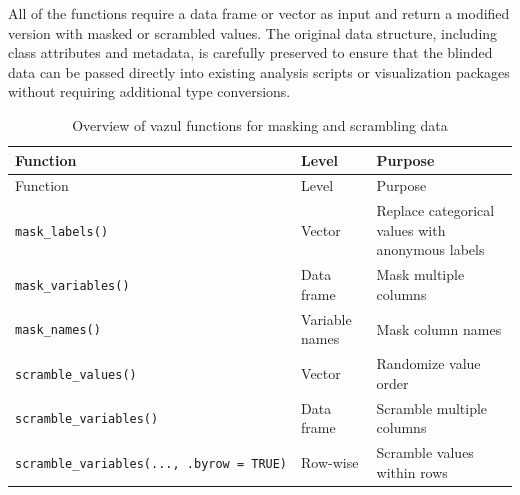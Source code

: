 All of the functions require a data frame or vector as input and return a modified version with masked or scrambled values. The original data structure, including class attributes and metadata, is carefully preserved to ensure that the blinded data can be passed directly into existing analysis scripts or visualization packages without requiring additional type conversions.

\begin{longtable}[]{@{}
  >{\raggedright\arraybackslash}p{}
  >{\raggedright\arraybackslash}p{}
  >{\raggedright\arraybackslash}p{}@{}}
\caption{Overview of vazul functions for masking and scrambling data}\tabularnewline
\toprule\noalign{}
\begin{minipage}[b]{\linewidth}\raggedright
Function
\end{minipage} & \begin{minipage}[b]{\linewidth}\raggedright
Level
\end{minipage} & \begin{minipage}[b]{\linewidth}\raggedright
Purpose
\end{minipage} \\
\midrule\noalign{}
\endfirsthead
\toprule\noalign{}
\begin{minipage}[b]{\linewidth}\raggedright
Function
\end{minipage} & \begin{minipage}[b]{\linewidth}\raggedright
Level
\end{minipage} & \begin{minipage}[b]{\linewidth}\raggedright
Purpose
\end{minipage} \\
\midrule\noalign{}
\endhead
\bottomrule\noalign{}
\endlastfoot
\texttt{mask\_labels()} & Vector & Replace categorical values with anonymous labels \\
\texttt{mask\_variables()} & Data frame & Mask multiple columns \\
\texttt{mask\_names()} & Variable names & Mask column names \\
\texttt{scramble\_values()} & Vector & Randomize value order \\
\texttt{scramble\_variables()} & Data frame & Scramble multiple columns \\
\texttt{scramble\_variables(...,\ .byrow\ =\ TRUE)} & Row-wise & Scramble values within rows \\
\end{longtable}

